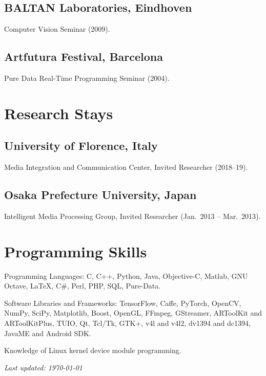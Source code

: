 \documentclass[11pt]{article}
\newenvironment{entries}{%
  \begin{list}{}{\setlength{\leftmargin}{3em}\setlength{\itemindent}{-1.5em}%
    \setlength{\itemsep}{0.35em}\setlength{\parsep}{0pt}\setlength{\topsep}{0.2em}}}%
  {\end{list}}
\begin{document}
\subsection*{BALTAN Laboratories, Eindhoven}
\begin{entries}
\item Computer Vision Seminar (2009).
\end{entries}

\subsection*{Artfutura Festival, Barcelona}
\begin{entries}
\item Pure Data Real-Time Programming Seminar (2004).
\end{entries}

\section*{Research Stays}
\subsection*{University of Florence, Italy}
\begin{entries}
\item Media Integration and Communication Center, Invited Researcher (2018--19).
\end{entries}
\subsection*{Osaka Prefecture University, Japan}
\begin{entries}
\item Intelligent Media Processing Group, Invited Researcher (Jan.\ 2013 -- Mar.\ 2013).
\end{entries}

\section*{Programming Skills}
\begin{entries}
\item Programming Languages: C, C++, Python, Java, Objective-C, Matlab, GNU Octave, \LaTeX, C\#, Perl, PHP, SQL, Pure-Data.
\item Software Libraries and Frameworks: TensorFlow, Caffe, PyTorch, OpenCV, NumPy, SciPy, Matplotlib, Boost, OpenGL, FFmpeg, GStreamer, ARToolKit and ARToolKitPlus, TUIO, Qt, Tcl/Tk, GTK+, v4l and v4l2, dv1394 and dc1394, JavaME and Android SDK.
\item Knowledge of Linux kernel device module programming.
\end{entries}

\vfill
{\small\textit{Last updated: \today}}
\end{document}
